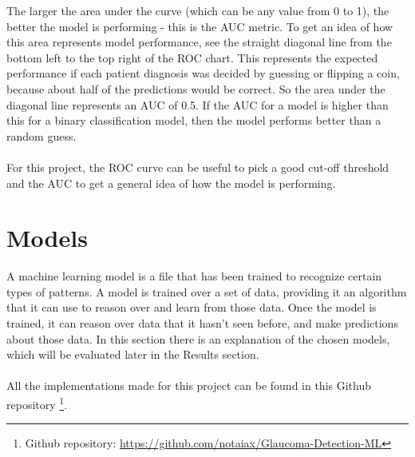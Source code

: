 \documentclass[11pt, a4paper]{article}
\begin{document}
The larger the area under the curve (which can be any value from 0 to 1), the better the model is performing - this is the AUC metric. To get an idea of how this area represents model performance, see the straight diagonal line from the bottom left to the top right of the ROC chart. This represents the expected performance if
each patient diagnosis was decided by guessing or flipping a coin, because about half of the predictions would be correct. So the area under the diagonal line represents an AUC of 0.5. If the AUC for a model is higher than this for a binary classification model, then the model performs better than a random guess.
\\\\ For this project, the ROC curve can be useful to pick a good cut-off threshold and the AUC to get a general idea of how the model is performing.

\section{Models}
A machine learning model is a file that has been trained to recognize certain types of patterns. A model is trained over a set of data, providing it an algorithm that it can use to reason over and learn from those data. Once the model is trained, it can reason over data that it hasn't seen before, and make predictions about those data. In this section there is an explanation of the chosen models, which will be evaluated later in the Results section.
\\\\
All the implementations made for this project can be found in this Github repository \footnote{Github repository: \url{https://github.com/notaiax/Glaucoma-Detection-ML}}. 
\end{document}
